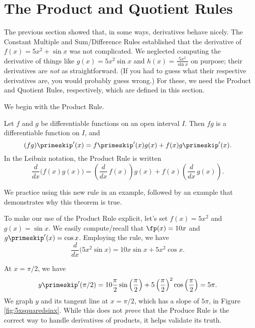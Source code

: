 \section{The Product and Quotient Rules}\label{sec:prod_quot_rules}

The previous section showed that, in some ways, derivatives behave nicely. The Constant Multiple and Sum/Difference Rules established that the derivative of $f(x) = 5x^2+\sin x $ was not complicated. We neglected computing the derivative of things like $g(x) = 5x^2\sin x$ and $h(x) = \frac{5x^2}{\sin x}$ on purpose; their derivatives are \textit{not} as straightforward. (If you had to guess what their respective derivatives are, you would probably guess wrong.) For these, we need the Product and Quotient Rules, respectively, which are defined in this section. 

We begin with the Product Rule.

{Let $f$ and $g$ be differentiable functions on an open interval $I$. Then $fg$ is a differentiable function on $I$, and 
\[
(fg)\primeskip'(x) = f\primeskip'(x)g(x) + f(x)g\primeskip'(x).
\]
}
In the Leibniz notation, the Product Rule is written
\[
\frac{d}{dx}\Big(f(x)g(x)\Big) = \left(\frac{d}{dx}\,f(x)\right)g(x)+f(x)\left(\frac{d}{dx}\,g(x)\right).
\]


We practice using this new rule in an example, followed by an example that demonstrates why this theorem is true.\\

{To make our use of the Product Rule explicit, let's set $f(x) = 5x^2$ and $g(x) = \sin x$. We easily compute/recall that $\fp(x) = 10x$ and $g\primeskip'(x) = \cos x$. Employing the rule, we have 
\[
\frac{d}{dx}\Big(5x^2\sin x\Big) = 10x\sin x + 5x^2\cos x.
\]

At $x=\pi/2$, we have 
\[
y\primeskip'(\pi/2) =  10\frac{\pi}2 \sin\left(\frac{\pi}{2}\right) + 5\left(\frac{\pi}{2}\right)^2\cos \left(\frac{\pi}2\right) = 5\pi.
\]
We graph $y$ and its tangent line at $x=\pi/2$, which has a slope of $5\pi$, in Figure \ref{fig:5xsquaredsinx}. While this does not \textit{prove} that the Produce Rule is the correct way to handle derivatives of products, it helps validate its truth.
}\\

